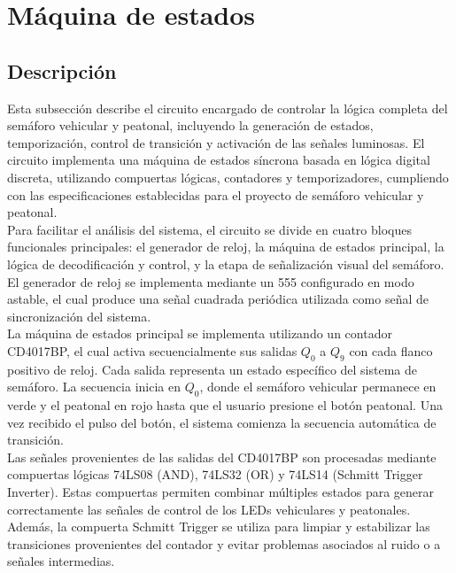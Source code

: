 \documentclass[12pt, journal, onecolumn]{IEEEtran}
\begin{document}
\newpage

\section{\textbf{Máquina de estados}}
\subsection{Descripción}
Esta subsección describe el circuito encargado de controlar la lógica completa del semáforo vehicular y peatonal, incluyendo la generación de estados, temporización, control de transición y activación de las señales luminosas. El circuito implementa una máquina de estados síncrona basada en lógica digital discreta, utilizando compuertas lógicas, contadores y temporizadores, cumpliendo con las especificaciones establecidas para el proyecto de semáforo vehicular y peatonal.\\

Para facilitar el análisis del sistema, el circuito se divide en cuatro bloques funcionales principales: el generador de reloj, la máquina de estados principal, la lógica de decodificación y control, y la etapa de señalización visual del semáforo.\\

El generador de reloj se implementa mediante un 555 configurado en modo astable, el cual produce una señal cuadrada periódica utilizada como señal de sincronización del sistema.\\

La máquina de estados principal se implementa utilizando un contador CD4017BP, el cual activa secuencialmente sus salidas $Q_0$ a $Q_9$ con cada flanco positivo de reloj. Cada salida representa un estado específico del sistema de semáforo. La secuencia inicia en $Q_0$, donde el semáforo vehicular permanece en verde y el peatonal en rojo hasta que el usuario presione el botón peatonal. Una vez recibido el pulso del botón, el sistema comienza la secuencia automática de transición.\\

Las señales provenientes de las salidas del CD4017BP son procesadas mediante compuertas lógicas 74LS08 (AND), 74LS32 (OR) y 74LS14 (Schmitt Trigger Inverter). Estas compuertas permiten combinar múltiples estados para generar correctamente las señales de control de los LEDs vehiculares y peatonales. Además, la compuerta Schmitt Trigger se utiliza para limpiar y estabilizar las transiciones provenientes del contador y evitar problemas asociados al ruido o a señales intermedias.\\
\end{document}
